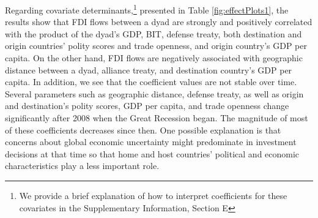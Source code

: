 \documentclass[reqno,onecolumn,letterpaper,12pt]{article}
\begin{document}
Regarding covariate determinants,\footnote{We provide a brief explanation of how to interpret coefficients for these covariates in the Supplementary Information, Section E} presented in Table \ref{fig:effectPlots1}, the results show that FDI flows between a dyad are strongly and positively correlated with the product of the dyad's GDP, BIT, defense treaty, both destination and origin countries' polity scores and trade openness, and origin country's GDP per capita. On the other hand, FDI flows are negatively associated with geographic distance between a dyad, alliance treaty, and destination country's GDP per capita. In addition, we see that the coefficient values are not stable over time. Several parameters such as geographic distance, defense treaty, as well as origin and destination's polity scores, GDP per capita, and trade openness change significantly after 2008 when the Great Recession began. The magnitude of most of these coefficients decreases since then. One possible explanation is that concerns about global economic uncertainty might predominate in investment decisions at that time so that home and host countries' political and economic characteristics play a less important role.
\end{document}
